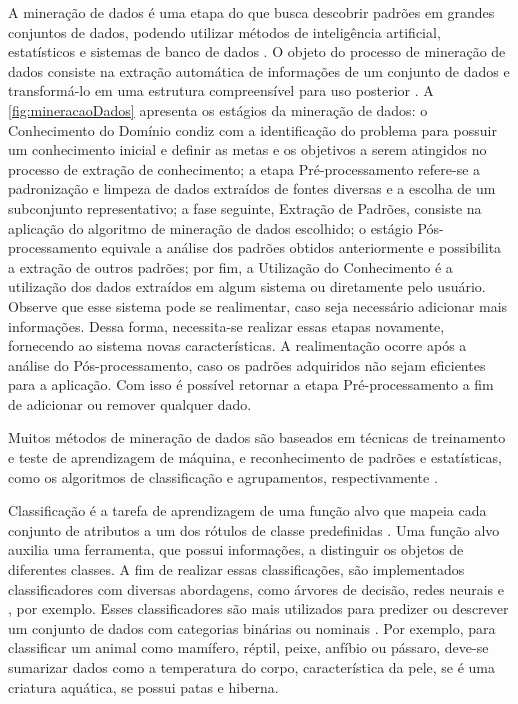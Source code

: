 		A mineração de dados é uma etapa do 
		\cite{fayyad1996} que busca descobrir padrões em grandes conjuntos de dados,
		podendo utilizar métodos de inteligência artificial, estatísticos e sistemas
		de banco de dados \cite{chakrabarti2006}. O objeto do processo de mineração
		de dados consiste na extração automática de informações de um conjunto de dados e
		transformá-lo em uma estrutura compreensível para uso posterior \cite{chakrabarti2006}.
		A \cref{fig:mineracaoDados} apresenta os estágios da mineração de dados:
		o Conhecimento do Domínio condiz com a identificação do problema para possuir
		um conhecimento inicial e definir as metas e os objetivos a serem atingidos
		no processo de extração de conhecimento; a etapa Pré-processamento refere-se
		a padronização e limpeza de dados extraídos de fontes diversas e  a escolha
		de um subconjunto representativo; a fase seguinte, Extração de Padrões, 
		consiste na aplicação do algoritmo de mineração de dados escolhido; o estágio
		Pós-processamento equivale a análise dos padrões obtidos anteriormente e
		possibilita a extração de outros padrões; por fim, a Utilização do Conhecimento
		é a utilização dos dados extraídos em algum sistema ou diretamente
		pelo usuário. Observe que esse sistema pode se realimentar, caso seja necessário
		adicionar mais informações. Dessa forma, necessita-se realizar essas etapas
		novamente, fornecendo ao sistema novas características. A realimentação
		ocorre após a análise do Pós-processamento, caso os padrões adquiridos não
		sejam eficientes para a aplicação. Com isso é possível retornar a etapa
		Pré-processamento a fim de adicionar ou remover qualquer dado.   %
		
		Muitos métodos de mineração de dados são baseados em técnicas de treinamento
		e teste de aprendizagem de máquina, e reconhecimento de padrões e estatísticas,
		como os algoritmos de classificação e agrupamentos, respectivamente \cite{fayyad1996}.
		
		Classificação é a tarefa de aprendizagem de uma função alvo que mapeia cada
		conjunto de atributos a um dos rótulos de classe predefinidas \cite{Tan:2005:ch4}.
		Uma função alvo auxilia uma ferramenta, que possui informações, a distinguir
		os objetos de diferentes classes. A fim de realizar essas classificações, são
		implementados classificadores com diversas abordagens, como árvores de decisão,
		redes neurais e , por exemplo. Esses
		classificadores são mais utilizados para predizer ou descrever um conjunto
		de dados com categorias binárias ou nominais \cite{Tan:2005:ch4}. Por exemplo,
		para classificar um animal como mamífero, réptil, peixe, anfíbio ou pássaro,
		deve-se sumarizar dados como a temperatura do corpo, característica da pele,
		se é uma criatura aquática, se possui patas e hiberna.
		
